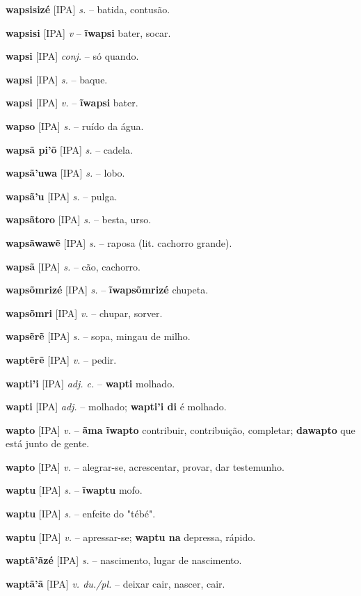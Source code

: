 \textbf{wapsisizé} [IPA] \textit{s.} -- batida, contusão.

\textbf{wapsisi} [IPA] \textit{v} -- \textbf{ĩwapsi} bater, socar.

\textbf{wapsi} [IPA] \textit{conj.} -- só quando.

\textbf{wapsi} [IPA] \textit{s.} -- baque.

\textbf{wapsi} [IPA] \textit{v.} -- \textbf{ĩwapsi} bater.

\textbf{wapso} [IPA] \textit{s.} -- ruído da água.

\textbf{wapsã pi'õ} [IPA] \textit{s.} -- cadela.

\textbf{wapsã'uwa} [IPA] \textit{s.} -- lobo.

\textbf{wapsã'u} [IPA] \textit{s.} -- pulga.

\textbf{wapsãtoro} [IPA] \textit{s.} -- besta, urso.

\textbf{wapsãwawẽ} [IPA] \textit{s.} -- raposa (lit. cachorro grande).

\textbf{wapsã} [IPA] \textit{s.} -- cão, cachorro.

\textbf{wapsõmrizé} [IPA] \textit{s.} -- \textbf{ĩwapsõmrizé} chupeta.

\textbf{wapsõmri} [IPA] \textit{v.} -- chupar, sorver.

\textbf{wapsẽrẽ} [IPA] \textit{s.} -- sopa, mingau de milho.

\textbf{waptẽrẽ} [IPA] \textit{v.} -- pedir.

\textbf{wapti'i} [IPA] \textit{adj. c.} -- \textbf{wapti} molhado.

\textbf{wapti} [IPA] \textit{adj.} -- molhado; \textbf{wapti'i di} é molhado.

\textbf{wapto} [IPA] \textit{v.} -- \textbf{ãma ĩwapto} contribuir, contribuição, completar; \textbf{dawapto} que está junto de gente.

\textbf{wapto} [IPA] \textit{v.} -- alegrar-se, acrescentar, provar, dar testemunho.

\textbf{waptu} [IPA] \textit{s.} -- \textbf{ĩwaptu} mofo.

\textbf{waptu} [IPA] \textit{s.} -- enfeite do "tébé".

\textbf{waptu} [IPA] \textit{v.} -- apressar-se; \textbf{waptu na} depressa, rápido.

\textbf{waptã'ãzé} [IPA] \textit{s.} -- nascimento, lugar de nascimento.

\textbf{waptã'ã} [IPA] \textit{v. du./pl.} -- deixar cair, nascer, cair.

